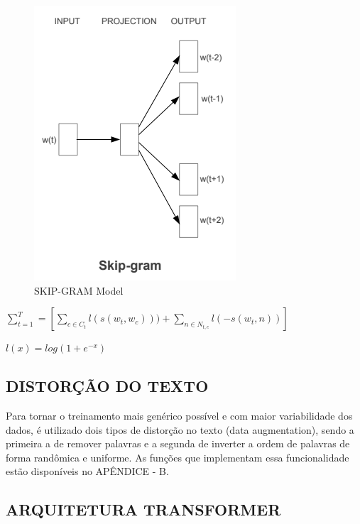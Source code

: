 \begin{figure}[htb]
	\caption{\label{skip_gram_model} SKIP-GRAM Model}
	\begin{center}
	    \includegraphics[scale=0.5]{artigo/recursos/imagens/skip_gram_model.png}
	\end{center}
\end{figure}

\begin{center}\large
    $\sum_{t=1}^{T} = \left [ \sum_{c \in C_t} l(s(w_t, w_c))) + \sum_{n \in N_{t,c}} l(-s(w_t, n)) \right ]$
\end{center}

\begin{center}\large
    $l(x) = log(1 + e^{-x})$
\end{center}

\subsection{DISTORÇÃO DO TEXTO}

Para tornar o treinamento mais genérico possível e com maior variabilidade dos dados, é utilizado dois tipos de distorção no texto (data augmentation), sendo a primeira a de remover palavras e a segunda de inverter a ordem de palavras de forma randômica e uniforme. As funções que implementam essa funcionalidade estão disponíveis no APÊNDICE - B.

\subsection{ARQUITETURA TRANSFORMER}

